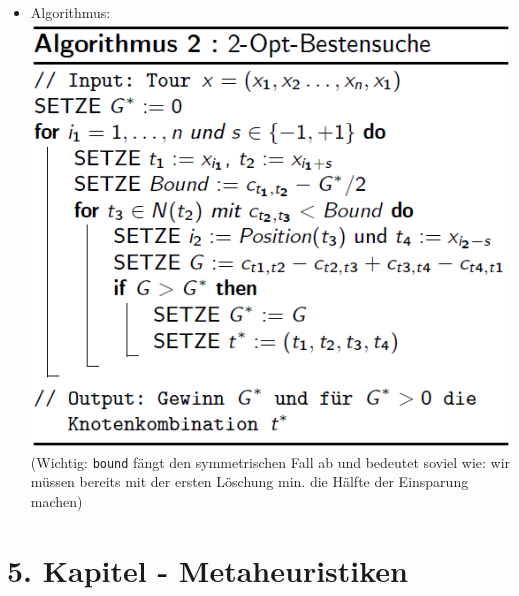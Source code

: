 \documentclass[12pt]{article}
\begin{document}
\begin{itemize}
\begin{itemize}
					\item Algorithmus:\\
						\includegraphics[scale=0.6]{SequentielleSucheAlgo}\\
						(Wichtig: \texttt{bound} fängt den symmetrischen Fall ab und bedeutet soviel wie: wir müssen bereits mit der ersten Löschung min. die Hälfte der Einsparung machen)
				\end{itemize}
		\end{itemize}
	\section{5. Kapitel - Metaheuristiken}
\end{document}
